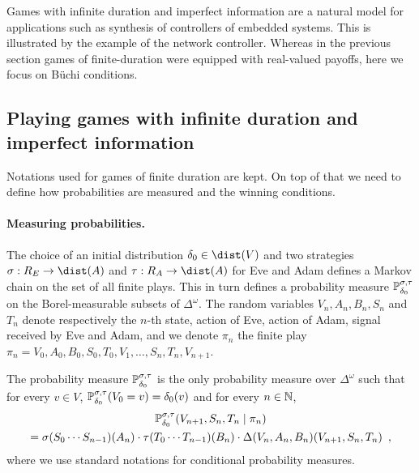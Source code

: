 Games with infinite duration and imperfect information
are a natural model for applications such as synthesis 
of controllers of embedded systems.
This is illustrated by the example of the network controller.
Whereas in the previous section games of finite-duration
were equipped with real-valued payoffs, 
here we focus on B{\"u}chi conditions.


\subsection{Playing games with infinite duration and imperfect information }

Notations used for games of finite duration are kept.
On top of that we need to define how probabilities are measured
and the winning conditions.

\paragraph{Measuring probabilities.}
The choice of an initial distribution
$\ini\in\dist(V)$ 
and two strategies
$\sigma:  R_E \to \dist(A)$
and $\tau:  R_A \to \dist(A)$
for Eve and Adam
defines a Markov chain on the set of all finite plays.
This in turn defines a probability measure
$\mathbb{P}_{\delta_0}^{\sigma,\tau}$ on the Borel-measurable
subsets of $\Delta^\omega$.
The random variables $V_n,A_n,B_n,S_{n}$ and $T_{n}$ denote
respectively the $n$-th state, action of Eve, action of Adam, 
signal received by Eve and Adam,
and we denote $\pi_n$ the finite play 
$\pi_n = V_0,A_0,B_0,S_0,T_0,V_1,\ldots,S_{n},T_{n},V_{n+1}$.

The probability measure $\mathbb{P}_{\delta_0}^{\sigma,\tau}$ is the only
probability measure over $\Delta^\omega$ such that
for every $v\in V$, 
$\mathbb{P}^{\sigma,\tau}_{\delta_0}(V_0 = v) = \delta_0(v)$
and for every $n\in\mathbb{N}$,
\begin{multline*}
\mathbb{P}^{\sigma,\tau}_{\delta_0}(V_{n+1}, S_{n}, T_{n} \mid \pi_n) \\
= \sigma(S_0\cdots S_{n-1})(A_{n}) \cdot \tau(T_0\cdots T_{n-1})(B_n) \cdot \Delta(V_n,A_n,B_n)(V_{n+1},S_{n},T_{n})\enspace,
\end{multline*}
where we use standard notations for conditional probability measures.

